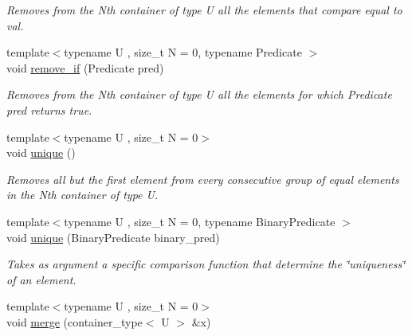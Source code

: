 \begin{DoxyCompactItemize}
\begin{DoxyCompactList}\small\item\em Removes from the Nth container of type U all the elements that compare equal to val. \end{DoxyCompactList}\item 
\hypertarget{classheterogeneous_1_1heterolist_3_01_t_00_01_types_8_8_8_4_a017ca08094e019deb3e8675580cfa401}{}{\footnotesize template$<$typename U , size\+\_\+t N = 0, typename Predicate $>$ }\\void \hyperlink{classheterogeneous_1_1heterolist_3_01_t_00_01_types_8_8_8_4_a017ca08094e019deb3e8675580cfa401}{remove\+\_\+if} (Predicate pred)\label{classheterogeneous_1_1heterolist_3_01_t_00_01_types_8_8_8_4_a017ca08094e019deb3e8675580cfa401}

\begin{DoxyCompactList}\small\item\em Removes from the Nth container of type U all the elements for which Predicate pred returns true. \end{DoxyCompactList}\item 
\hypertarget{classheterogeneous_1_1heterolist_3_01_t_00_01_types_8_8_8_4_a616258263572ccac199c7cf47d509ef3}{}{\footnotesize template$<$typename U , size\+\_\+t N = 0$>$ }\\void \hyperlink{classheterogeneous_1_1heterolist_3_01_t_00_01_types_8_8_8_4_a616258263572ccac199c7cf47d509ef3}{unique} ()\label{classheterogeneous_1_1heterolist_3_01_t_00_01_types_8_8_8_4_a616258263572ccac199c7cf47d509ef3}

\begin{DoxyCompactList}\small\item\em Removes all but the first element from every consecutive group of equal elements in the Nth container of type U. \end{DoxyCompactList}\item 
{\footnotesize template$<$typename U , size\+\_\+t N = 0, typename Binary\+Predicate $>$ }\\void \hyperlink{classheterogeneous_1_1heterolist_3_01_t_00_01_types_8_8_8_4_aa0c6360751ae3a1320a2abaa4a0b4110}{unique} (Binary\+Predicate binary\+\_\+pred)
\begin{DoxyCompactList}\small\item\em Takes as argument a specific comparison function that determine the \char`\"{}uniqueness\char`\"{} of an element. \end{DoxyCompactList}\item 
\hypertarget{classheterogeneous_1_1heterolist_3_01_t_00_01_types_8_8_8_4_aa0795a0a1d84c759a7deae8d673f4ee1}{}{\footnotesize template$<$typename U , size\+\_\+t N = 0$>$ }\\void \hyperlink{classheterogeneous_1_1heterolist_3_01_t_00_01_types_8_8_8_4_aa0795a0a1d84c759a7deae8d673f4ee1}{merge} (container\+\_\+type$<$ U $>$ \&x)\label{classheterogeneous_1_1heterolist_3_01_t_00_01_types_8_8_8_4_aa0795a0a1d84c759a7deae8d673f4ee1}


\end{DoxyCompactItemize}
